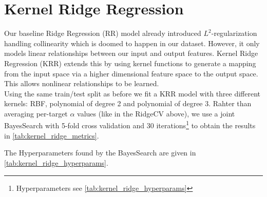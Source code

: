 \section{Kernel Ridge Regression}
\label{sec:kernel_ridge_regression}
Our baseline Ridge Regression (RR) model already introduced $L^2$-regularization handling collinearity which is doomed to happen in our dataset. However, it only models linear relationships between our input and output features. Kernel Ridge Regression (KRR) extends this by using kernel functions to generate a mapping from the input space via a higher dimensional feature space to the output space. This allows nonlinear relationships to be learned. \\
Using the same train/test split as before we fit a KRR model with three different kernels: RBF, polynomial of degree 2 and polynomial of degree 3. 
Rahter than averaging per-target $\alpha$ values (like in the RidgeCV above), we use a joint BayesSearch with 5-fold cross validation and 30 iterations\footnote{Hyperparameters see \autoref{tab:kernel_ridge_hyperparams}} to obtain the results in \autoref{tab:kernel_ridge_metrics}.

\begin{table}[h]
    \centering
    \caption{Comparison of different Kernel Ridge regression (KRR) guessing schemes for 102 (20\%) test samples from the  subset from QM9 \parencite{ref:article1_qm9}. The F-score is calculated using the Fock matrix prediction from the Kernel-Ridge regression model and the \texttt{minao} guess. The number of iterations until convergence is shown as well as the percentage samples not converging within 50 iterations and the inference time as a factor of the inference time of the minao guess.}
    \label{tab:kernel_ridge_metrics}
\end{table}
The Hyperparameters found by the BayesSearch are given in \autoref{tab:kernel_ridge_hyperparams}.

